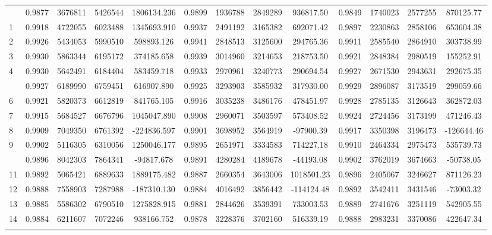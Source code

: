 \documentclass[
  12pt,
]{article}
\begin{document}
\begin{longtable}[t]{lcccccccccccc}
\endfoot
\bottomrule
\endlastfoot
0 & 0.9877 & 3676811 & 5426544 & 1806134.236 & 0.9899 & 1936788 & 2849289 & 936817.50 & 0.9849 & 1740023 & 2577255 & 870125.77\\
1 & 0.9918 & 4722055 & 6023488 & 1345693.910 & 0.9937 & 2491192 & 3165382 & 692071.42 & 0.9897 & 2230863 & 2858106 & 653604.38\\
2 & 0.9926 & 5434053 & 5990510 & 598893.126 & 0.9941 & 2848513 & 3125600 & 294765.36 & 0.9911 & 2585540 & 2864910 & 303738.99\\
3 & 0.9930 & 5863344 & 6195172 & 374185.658 & 0.9939 & 3014960 & 3214653 & 218753.50 & 0.9921 & 2848384 & 2980519 & 155252.91\\
4 & 0.9930 & 5642491 & 6184404 & 583459.718 & 0.9933 & 2970961 & 3240773 & 290694.54 & 0.9927 & 2671530 & 2943631 & 292675.35\\
\addlinespace
5 & 0.9927 & 6189990 & 6759451 & 616907.890 & 0.9925 & 3293903 & 3585932 & 317930.00 & 0.9929 & 2896087 & 3173519 & 299059.66\\
6 & 0.9921 & 5820373 & 6612819 & 841765.105 & 0.9916 & 3035238 & 3486176 & 478451.97 & 0.9928 & 2785135 & 3126643 & 362872.03\\
7 & 0.9915 & 5684527 & 6676796 & 1045047.890 & 0.9908 & 2960071 & 3503597 & 573408.52 & 0.9924 & 2724456 & 3173199 & 471246.43\\
8 & 0.9909 & 7049350 & 6761392 & -224836.597 & 0.9901 & 3698952 & 3564919 & -97900.39 & 0.9917 & 3350398 & 3196473 & -126644.46\\
9 & 0.9902 & 5116305 & 6310056 & 1250046.177 & 0.9895 & 2651971 & 3334583 & 714227.18 & 0.9910 & 2464334 & 2975473 & 535739.73\\
\addlinespace
10 & 0.9896 & 8042303 & 7864341 & -94817.678 & 0.9891 & 4280284 & 4189678 & -44193.08 & 0.9902 & 3762019 & 3674663 & -50738.05\\
11 & 0.9892 & 5065421 & 6889633 & 1889175.482 & 0.9887 & 2660354 & 3643006 & 1018501.23 & 0.9896 & 2405067 & 3246627 & 871126.23\\
12 & 0.9888 & 7558903 & 7287988 & -187310.130 & 0.9884 & 4016492 & 3856442 & -114124.48 & 0.9892 & 3542411 & 3431546 & -73003.32\\
13 & 0.9885 & 5586302 & 6790510 & 1275828.915 & 0.9881 & 2844626 & 3539391 & 733003.53 & 0.9889 & 2741676 & 3251119 & 542905.55\\
14 & 0.9884 & 6211607 & 7072246 & 938166.752 & 0.9878 & 3228376 & 3702160 & 516339.19 & 0.9888 & 2983231 & 3370086 & 422647.34\\
\addlinespace

\end{longtable}
\end{document}
